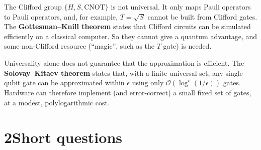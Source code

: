 \documentclass[11pt,a4paper]{article}
\begin{document}
The Clifford group $\{H,S,\text{CNOT}\}$ is not universal. It only maps Pauli operators to Pauli
operators, and, for example, $T=\sqrt S$ cannot be built from Clifford gates. The
\textbf{Gottesman--Knill theorem} states that Clifford circuits can be simulated efficiently on a
classical computer. So they cannot give a quantum advantage, and some non-Clifford resource
(``magic'', such as the $T$ gate) is needed.

Universality alone does not guarantee that the approximation is efficient. The
\textbf{Solovay--Kitaev theorem} states that, with a finite universal set, any single-qubit gate can
be approximated within $\epsilon$ using only $\mathcal{O}(\log^c(1/\epsilon))$ gates. Hardware can
therefore implement (and error-correct) a small fixed set of gates, at a modest, polylogarithmic cost.

\section*{2\quad Short questions}
\end{document}
